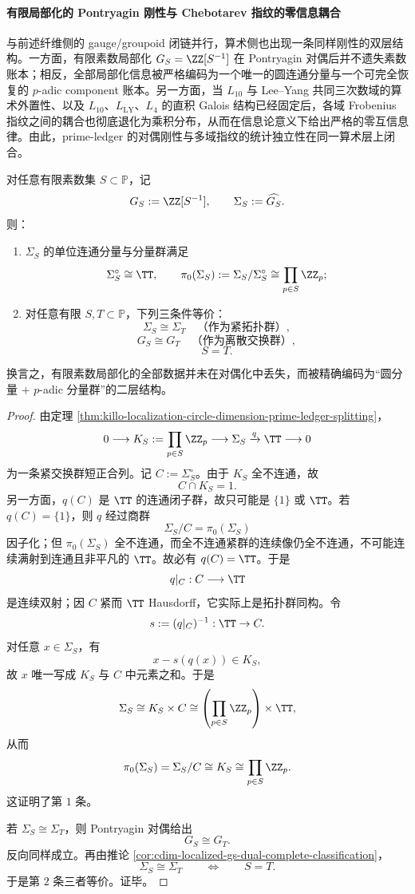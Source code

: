 \paragraph{有限局部化的 Pontryagin 刚性与 Chebotarev 指纹的零信息耦合}
与前述纤维侧的 gauge/groupoid 闭链并行，算术侧也出现一条同样刚性的双层结构。一方面，有限素数局部化 \(G_S=\ZZ[S^{-1}]\) 在 Pontryagin 对偶后并不遗失素数账本；相反，全部局部化信息被严格编码为一个唯一的圆连通分量与一个可完全恢复的 \(p\)-adic component 账本。另一方面，当 \(L_{10}\) 与 Lee--Yang 共同三次数域的算术外置性、以及 \(L_{10}\)、\(L_{\mathrm{LY}}\)、\(L_4\) 的直积 Galois 结构已经固定后，各域 Frobenius 指纹之间的耦合也彻底退化为乘积分布，从而在信息论意义下给出严格的零互信息律。由此，prime-ledger 的对偶刚性与多域指纹的统计独立性在同一算术层上闭合。

\begin{theorem}\label{thm:xi-time-part9zg-finite-localization-pontryagin-rigidity}
对任意有限素数集 \(S\subset \mathbb P\)，记
\[
G_S:=\ZZ[S^{-1}],
\qquad
\Sigma_S:=\widehat{G_S}.
\]
则：
\begin{enumerate}
  \item \(\Sigma_S\) 的单位连通分量与分量群满足
  \[
  \Sigma_S^\circ\cong \TT,
  \qquad
  \pi_0(\Sigma_S):=\Sigma_S/\Sigma_S^\circ\cong \prod_{p\in S}\ZZ_p;
  \]
  \item 对任意有限 \(S,T\subset\mathbb P\)，下列三条件等价：
  \[
  \Sigma_S\cong \Sigma_T
  \quad\text{（作为紧拓扑群）},
  \]
  \[
  G_S\cong G_T
  \quad\text{（作为离散交换群）},
  \]
  \[
  S=T.
  \]
\end{enumerate}
换言之，有限素数局部化的全部数据并未在对偶化中丢失，而被精确编码为“圆分量 \(+\) \(p\)-adic 分量群”的二层结构。
\end{theorem}
\begin{proof}
由定理 \ref{thm:killo-localization-circle-dimension-prime-ledger-splitting}，
\[
0\longrightarrow K_S:=\prod_{p\in S}\ZZ_p
\longrightarrow
\Sigma_S
\xrightarrow{q}
\TT
\longrightarrow 0
\]
为一条紧交换群短正合列。记 \(C:=\Sigma_S^\circ\)。由于 \(K_S\) 全不连通，故
\[
C\cap K_S=1.
\]
另一方面，\(q(C)\) 是 \(\TT\) 的连通闭子群，故只可能是 \(\{1\}\) 或 \(\TT\)。若 \(q(C)=\{1\}\)，则 \(q\) 经过商群
\[
\Sigma_S/C=\pi_0(\Sigma_S)
\]
因子化；但 \(\pi_0(\Sigma_S)\) 全不连通，而全不连通紧群的连续像仍全不连通，不可能连续满射到连通且非平凡的 \(\TT\)。故必有 \(q(C)=\TT\)。于是
\[
q|_C:C\longrightarrow \TT
\]
是连续双射；因 \(C\) 紧而 \(\TT\) Hausdorff，它实际上是拓扑群同构。令
\[
s:=(q|_C)^{-1}:\TT\to C.
\]
对任意 \(x\in \Sigma_S\)，有
\[
x-\!s(q(x))\in K_S,
\]
故 \(x\) 唯一写成 \(K_S\) 与 \(C\) 中元素之和。于是
\[
\Sigma_S\cong K_S\times C\cong \left(\prod_{p\in S}\ZZ_p\right)\times \TT,
\]
从而
\[
\pi_0(\Sigma_S)=\Sigma_S/C\cong K_S\cong \prod_{p\in S}\ZZ_p.
\]
这证明了第 \(1\) 条。

若 \(\Sigma_S\cong \Sigma_T\)，则 Pontryagin 对偶给出
\[
G_S\cong G_T.
\]
反向同样成立。再由推论 \ref{cor:cdim-localized-gs-dual-complete-classification}，
\[
\Sigma_S\cong \Sigma_T
\qquad\Longleftrightarrow\qquad
S=T.
\]
于是第 \(2\) 条三者等价。证毕。
\end{proof}

